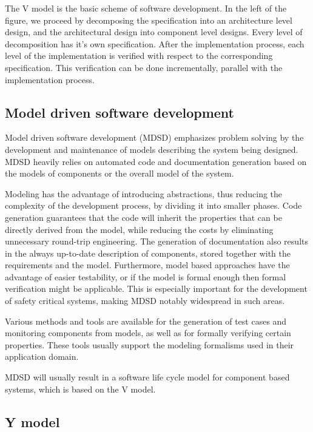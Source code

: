 The V model is the basic scheme of software development. In the left of the figure, we proceed by decomposing the specification into an architecture level design, and the architectural design into component level designs. Every level of decomposition has it's own specification. After the implementation process, each level of the implementation is verified with respect to the corresponding specification. This verification can be done incrementally, parallel  with the implementation process.

\subsection{Model driven software development}

Model driven software development (MDSD) emphasizes problem solving by the development and maintenance of models describing the system being designed. MDSD heavily relies on automated code and documentation generation based on the models of components or the overall model of the system. 

Modeling has the advantage of introducing abstractions, thus reducing the complexity of the development process, by dividing it into smaller phases. Code generation guarantees that the code will inherit the properties that can be directly derived from the model, while reducing the costs by eliminating unnecessary round-trip engineering. The generation of documentation also results in the always up-to-date description of components, stored together with the requirements and the model. Furthermore, model based approaches have the advantage of easier testability, or if the model is formal enough then formal verification might be applicable. This is especially important for the development of safety critical systems, making MDSD notably widespread in such areas.

Various methods and tools are available for the generation of test cases and monitoring components from models, as well as for formally verifying certain properties. These tools usually support the modeling formalisms used in their application domain.

MDSD will usually result in a software life cycle model for component based systems\citep{ymodel}, which is based on the V model.

\subsection{Y model} 

